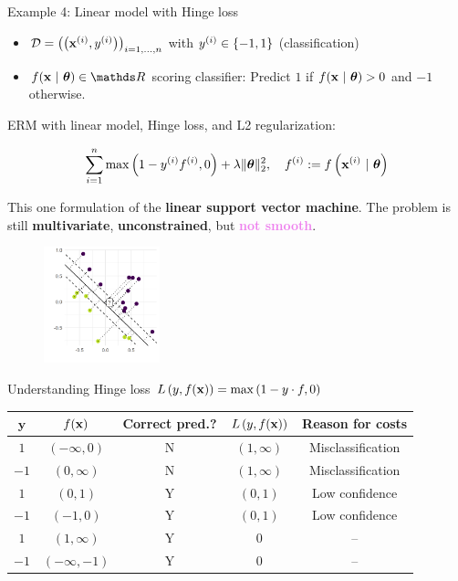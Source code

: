 \begin{vbframe}{Example 4: Linear model with Hinge loss}

\begin{footnotesize}
\begin{itemize}
	\item $\mathcal{D} = \left(\left(\mathbf{x}^{(i)}, y^{(i)}\right)\right)_{i = 1, ..., n}$ with $y^{(i)} \in \{-1, 1\}$ (classification)
	\item $\fxt \in \R$ scoring classifier: Predict $1$ if $f(\mathbf{x} ~|~ \bm{\theta}) > 0$ and $-1$ otherwise. 
\end{itemize}
\end{footnotesize}

ERM with linear model, Hinge loss, and L2 regularization: 

$$
	\sum\limits_{i=1}^n \max\left(1 - y^{(i)} f^{(i)}, 0\right) + \lambda \|\bm{\theta}\|_2^2, \quad f^{(i)} := f\left(\mathbf{x}^{(i)} ~|~ \bm{\theta}\right)
$$

\vspace*{-0.2cm}

This one formulation of the \textbf{linear support vector machine}. The problem is still \textbf{multivariate}, \textbf{unconstrained}, but \textcolor{violet}{\textbf{not smooth}}. 

\vspace*{-0.3cm}
\begin{figure}
	\begin{center}
		\includegraphics[width=0.3\textwidth]{figure_man/svm-example.pdf}
	\end{center}
\end{figure}

\framebreak 

Understanding Hinge loss $L\left(y, f(\mathbf{x})\right) = \max\left(1 - y\cdot f, 0\right)$

\begin{footnotesize}
\begin{center}
\begin{tabular}{ c | c | c | c | c }
$\mathbf{y}$ & $f(\mathbf{x})$ &  \textbf{Correct pred.?}  & $L\left(y, f(\mathbf{x})\right)$ & \textbf{Reason for costs}  \\ \hline
 $1$ & $(- \infty, 0)$  & N & $(1, \infty)$ & Misclassification \\
 $- 1$ & $(0, \infty)$ & N  & $(1, \infty)$ &  Misclassification \\
 $1$ & $(0, 1)$ & Y & $(0, 1)$ & Low confidence \\
 $- 1$ & $(-1, 0)$  & Y  & $(0, 1)$& Low confidence\\
 $1$ & $(1, \infty)$ &  Y & $0$ & -- \\
 $- 1$ & $(- \infty, -1)$ &  Y & $0$ & -- \\
\end{tabular}
\end{center}
\end{footnotesize}


\end{vbframe}
